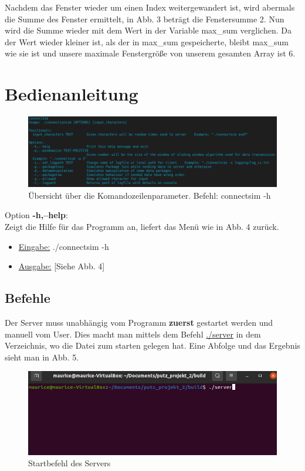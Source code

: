 \documentclass{article}
\begin{document}
Nachdem das Fenster wieder um einen Index weitergewandert ist, wird abermals die Summe des Fenster ermittelt, in Abb. 3 beträgt die Fenstersumme 2. Nun wird die Summe wieder mit dem Wert in der Variable max\_sum verglichen. Da der Wert wieder kleiner ist, als der in max\_sum gespeicherte, bleibt max\_sum wie sie ist und unsere maximale Fenstergröße von unserem gesamten Array ist 6.

\section{Bedienanleitung}
\begin{center}
\begin{figure}[h]
    \centering
    \includegraphics[width=\textwidth]{connectsim-h.png}
    \caption{Übersicht über die Komandozeilenparameter. Befehl: connectsim -h}
\end{figure}
\end{center}

Option \textbf{-h,--help}:\\
Zeigt die Hilfe für das Programm an, liefert das Menü wie in Abb. 4 zurück.
\begin{itemize}
	\item \underline{Eingabe:} ./connectsim -h
	\item \underline{Ausgabe:} [Siehe Abb. 4]\\
\end{itemize}

\break

\subsection{Befehle}
Der Server muss unabhängig vom Programm \textbf{zuerst} gestartet werden und manuell vom User. Dies macht man mittels dem Befehl \underline{./server} in dem Verzeichnis, wo die Datei zum starten gelegen hat. Eine Abfolge und das Ergebnis sieht man in Abb. 5.

\begin{center}
\begin{figure}[h]
    \centering
    \includegraphics[width=\textwidth]{connectsimserver.png}
    \caption{Startbefehl des Servers}
\end{figure}
\end{center}
\end{document}
